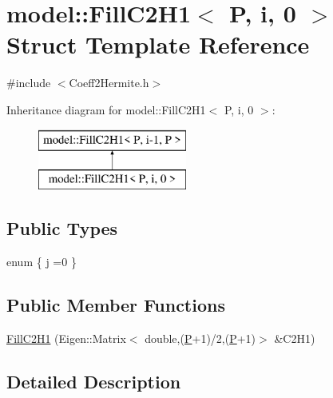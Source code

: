 \hypertarget{structmodel_1_1_fill_c2_h1_3_01_p_00_01i_00_010_01_4}{}\section{model\+:\+:Fill\+C2\+H1$<$ P, i, 0 $>$ Struct Template Reference}
\label{structmodel_1_1_fill_c2_h1_3_01_p_00_01i_00_010_01_4}


{\ttfamily \#include $<$Coeff2\+Hermite.\+h$>$}

Inheritance diagram for model\+:\+:Fill\+C2\+H1$<$ P, i, 0 $>$\+:\begin{figure}[H]
\begin{center}
\leavevmode
\includegraphics[height=2.000000cm]{structmodel_1_1_fill_c2_h1_3_01_p_00_01i_00_010_01_4}
\end{center}
\end{figure}
\subsection*{Public Types}
\begin{DoxyCompactItemize}
\item 
enum \{ \hyperlink{structmodel_1_1_fill_c2_h1_3_01_p_00_01i_00_010_01_4_a1a39f8b07213b67d0257ec221f75bc63acd0fd86c2f83eccc8c00a5cb8f1b0c71}{j} =0
 \}
\end{DoxyCompactItemize}
\subsection*{Public Member Functions}
\begin{DoxyCompactItemize}
\item 
\hyperlink{structmodel_1_1_fill_c2_h1_3_01_p_00_01i_00_010_01_4_a1bc5c8815a9ed8652604988700d400e9}{Fill\+C2\+H1} (Eigen\+::\+Matrix$<$ double,(\hyperlink{_f_e_m_2linear__elasticity__3d_2tetgen_2generate_p_o_l_ycube_8m_a50a9afb44201a65ab7ad5feb2150aeb6}{P}+1)/2,(\hyperlink{_f_e_m_2linear__elasticity__3d_2tetgen_2generate_p_o_l_ycube_8m_a50a9afb44201a65ab7ad5feb2150aeb6}{P}+1)$>$ \&C2\+H1)
\end{DoxyCompactItemize}


\subsection{Detailed Description}
